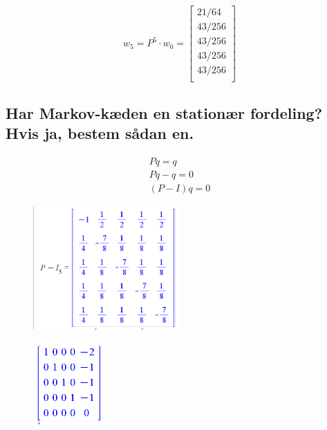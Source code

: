 \documentclass{article}
\begin{document}
\begin{equation}
    w_5 = P^5 \cdot w_0 =
    \begin{bmatrix}
        21/64 \\
        43/256 \\
        43/256 \\
        43/256 \\
        43/256 \\
    \end{bmatrix}
\end{equation}

\subsection{Har Markov-k\ae den en station\ae r fordeling? Hvis ja, bestem s\aa dan en.}

\begin{equation}
    \begin{array}{c}
        Pq = q \\
        Pq - q = 0 \\
        (P - I)q = 0
    \end{array}
\end{equation}

\begin{figure}[h]
    \centering
    \includegraphics[width = 0.5\textwidth]{pi}
\end{figure}

\begin{figure}[h]
    \centering
    \includegraphics[width = 0.25\textwidth]{rrefpi}
\end{figure}
\end{document}
